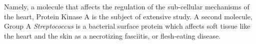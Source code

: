 \documentclass[12pt]{ucsddissertation}
\begin{document}
\begin{dissertationabstract}

Namely, a molecule that affects the regulation of the sub-cellular mechanisms of the heart, Protein Kinase A is the subject of extensive study. A second molecule, Group A \textit{Streptococcus} is a bacterial surface protein which affects soft tissue like the heart and the skin as a necrotizing fasciitis, or flesh-eating disease.

\end{dissertationabstract}
\end{document}
